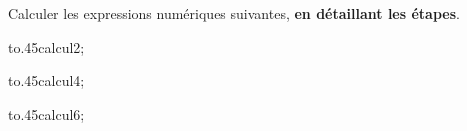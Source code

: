 \documentclass[exercice]{thedocument}%
\begin{document}
%
    Calculer les expressions numériques suivantes, {\bfseries en détaillant les étapes}.\par\vskip10pt\noindent
    \hbox{\hskip20pt\hbox to.45\linewidth{\newcalc\<calcul1;\hfill}\hbox{\newcalc\<calcul2;\hfill}}\par\medskip
    \hbox{\hskip20pt\hbox to.45\linewidth{\newcalc\<calcul3;\hfill}\hbox{\newcalc\<calcul4;\hfill}}\par\medskip
    \hbox{\hskip20pt\hbox to.45\linewidth{\newcalc\<calcul5;\hfill}\hbox{\newcalc\<calcul6;\hfill}}\par\medskip
\end{document}
